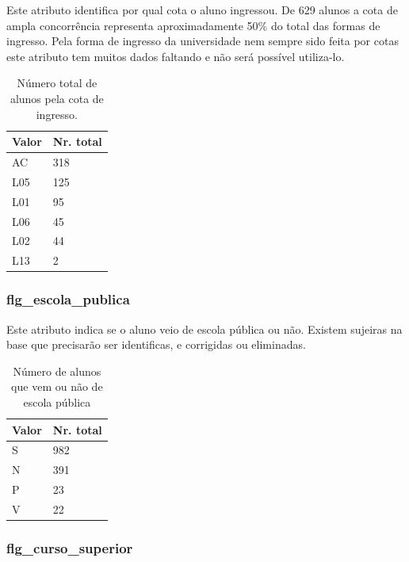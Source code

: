 \documentclass[diss,capa]{texufpel}
\begin{document}
Este atributo identifica por qual cota o aluno ingressou.
De 629 alunos a cota de ampla concorrência representa aproximadamente 50\% do total das formas de ingresso.
Pela forma de ingresso da universidade nem sempre sido feita por cotas este atributo tem muitos dados faltando e não será possível utiliza-lo.

\begin{table}[htbp]
\begin{center}
\caption{Número total de alunos pela cota de ingresso.}
\label{tab:total-alunos-cota-ingresso}
\begin{tabular}{p{8.5cm}|p{6cm}} \hline
Valor & Nr. total \\ \hline
AC    & 318 \\
L05   & 125 \\
L01   & 95 \\
L06   & 45 \\
L02   & 44 \\
L13   & 2 \\ \hline
\end{tabular}
\end{center}
\end{table}

\subsubsection{flg\_escola\_publica}

Este atributo indica se o aluno veio de escola pública ou não.
Existem sujeiras na base que precisarão ser identificas, e corrigidas ou eliminadas.

\begin{table}[htbp]
\begin{center}
\caption{Número de alunos que vem ou não de escola pública}
\label{tab:total-aluno-escolca-publica}
\begin{tabular}{p{8.5cm}|p{6cm}} \hline
Valor & Nr. total \\ \hline
S     & 982 \\
N     & 391 \\
P     &  23 \\
V     &  22 \\ \hline
\end{tabular}
\end{center}
\end{table}

\subsubsection{flg\_curso\_superior}
\end{document}
